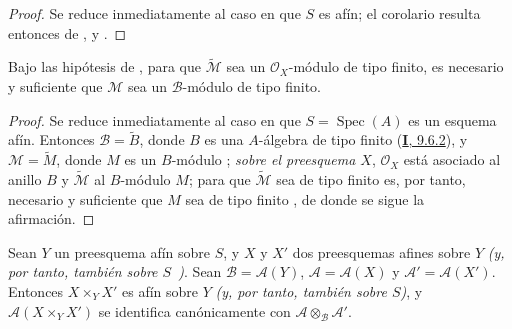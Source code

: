 \documentclass[oneside,10pt]{amsart}
\let\EGAOriginalLabel\label
\renewcommand{\label}[1]{\phantomsection\EGAOriginalLabel{#1}}
\begin{document}
\begin{proof}
Se reduce inmediatamente al caso en que $S$ es afín; el corolario resulta entonces de ,  y .
\end{proof}

\begin{corollary}[1.4.5]
\label{II.1.4.5-fr}
Bajo las hipótesis de , para que $\widetilde{\mathcal{M}}$ sea un $\mathcal{O}_X$-módulo de tipo finito, es necesario y suficiente que $\mathcal{M}$ sea un $\mathcal{B}$-módulo de tipo finito.
\end{corollary}

\begin{proof}
Se reduce inmediatamente al caso en que $S=\operatorname{Spec}(A)$ es un esquema afín.
Entonces $\mathcal{B}=\widetilde{B}$, donde $B$ es una $A$-álgebra de tipo finito (\hyperref[I.9.6.2-fr]{\textbf{I}, 9.6.2}), y $\mathcal{M}=\widetilde{M}$, donde $M$ es un $B$-módulo ; \emph{sobre el preesquema $X$}, $\mathcal{O}_X$ está asociado al anillo $B$ y $\widetilde{\mathcal{M}}$ al $B$-módulo $M$; para que $\widetilde{\mathcal{M}}$ sea de tipo finito es, por tanto, necesario y suficiente que $M$ sea de tipo finito , de donde se sigue la afirmación.
\end{proof}

\begin{proposition}[1.4.6]
\label{II.1.4.6-fr}
Sean $Y$ un preesquema afín sobre $S$, y $X$ y $X'$ dos preesquemas afines sobre $Y$ \emph{(y, por tanto, también sobre $S$~)}.
Sean $\mathcal{B}=\mathcal{A}(Y)$, $\mathcal{A}=\mathcal{A}(X)$ y $\mathcal{A}'=\mathcal{A}(X')$.
Entonces $X\times_Y X'$ es afín sobre $Y$ \emph{(y, por tanto, también sobre $S$)}, y $\mathcal{A}(X\times_Y X')$ se identifica canónicamente con $\mathcal{A}\otimes_{\mathcal{B}}\mathcal{A}'$.
\end{proposition}
\end{document}
